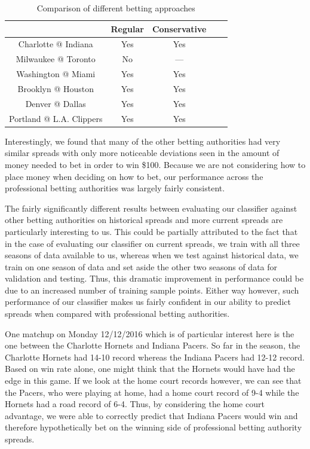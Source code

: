 \documentclass{article}
\begin{document}
\begin{table}
  \begin{center}
    \begin{tabular}{ | c | c | c | c | c | }
      \hline
                                & Regular      & Conservative  \\ \hline
      Charlotte @ Indiana       & Yes              & Yes   \\ \hline
      Milwaukee @ Toronto       & No               & ---   \\ \hline
      Washington @ Miami        & Yes              & Yes    \\ \hline
      Brooklyn @ Houston        & Yes              & Yes   \\ \hline
      Denver @ Dallas           & Yes              & Yes   \\ \hline
      Portland @ L.A. Clippers  & Yes              & Yes   \\ \hline
    \end{tabular}
  \end{center}
  \caption{Comparison of different betting approaches}
\end{table}


Interestingly, we found that many of the other betting authorities had very similar spreads with only more noticeable deviations seen in the amount of money needed to bet in order to win \$100. Because we are not considering how to place money when deciding on how to bet, our performance across the professional betting authorities was largely fairly consistent.

The fairly significantly different results between evaluating our classifier against other betting authorities on historical spreads and more current spreads are particularly interesting to us. This could be partially attributed to the fact that in the case of evaluating our classifier on current spreads, we train with all three seasons of data available to us, whereas when we test against historical data, we train on one season of data and set aside the other two seasons of data for validation and testing. Thus, this dramatic improvement in performance could be due to an increased number of training sample points. Either way however, such performance of our classifier makes us fairly confident in our ability to predict spreads when compared with professional betting authorities.

One matchup on Monday 12/12/2016 which is of particular interest here is the one between the Charlotte Hornets and Indiana Pacers. So far in the season, the Charlotte Hornets had 14-10 record whereas the Indiana Pacers had 12-12 record. Based on win rate alone, one might think that the Hornets would have had the edge in this game. If we look at the home court records however, we can see that the Pacers, who were playing at home, had a home court record of 9-4 while the Hornets had a road record of 6-4. Thus, by considering the home court advantage, we were able to correctly predict that Indiana Pacers would win and therefore hypothetically bet on the winning side of professional betting authority spreads.
\end{document}
